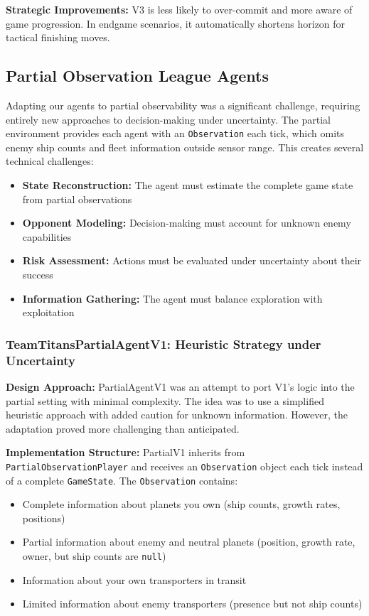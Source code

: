 \documentclass[conference]{IEEEtran}
\begin{document}
\textbf{Strategic Improvements:} V3 is less likely to over-commit and more aware of game progression. In endgame scenarios, it automatically shortens horizon for tactical finishing moves.

\subsection{Partial Observation League Agents}

Adapting our agents to partial observability was a significant challenge, requiring entirely new approaches to decision-making under uncertainty. The partial environment provides each agent with an \texttt{Observation} each tick, which omits enemy ship counts and fleet information outside sensor range. This creates several technical challenges:

\begin{itemize}
\item \textbf{State Reconstruction:} The agent must estimate the complete game state from partial observations
\item \textbf{Opponent Modeling:} Decision-making must account for unknown enemy capabilities
\item \textbf{Risk Assessment:} Actions must be evaluated under uncertainty about their success
\item \textbf{Information Gathering:} The agent must balance exploration with exploitation
\end{itemize}

\subsubsection{TeamTitansPartialAgentV1: Heuristic Strategy under Uncertainty}

\textbf{Design Approach:} PartialAgentV1 was an attempt to port V1's logic into the partial setting with minimal complexity. The idea was to use a simplified heuristic approach with added caution for unknown information. However, the adaptation proved more challenging than anticipated.

\textbf{Implementation Structure:} PartialV1 inherits from \texttt{PartialObservationPlayer} and receives an \texttt{Observation} object each tick instead of a complete \texttt{GameState}. The \texttt{Observation} contains:

\begin{itemize}
\item Complete information about planets you own (ship counts, growth rates, positions)
\item Partial information about enemy and neutral planets (position, growth rate, owner, but ship counts are \texttt{null})
\item Information about your own transporters in transit
\item Limited information about enemy transporters (presence but not ship counts)
\end{itemize}
\end{document}

